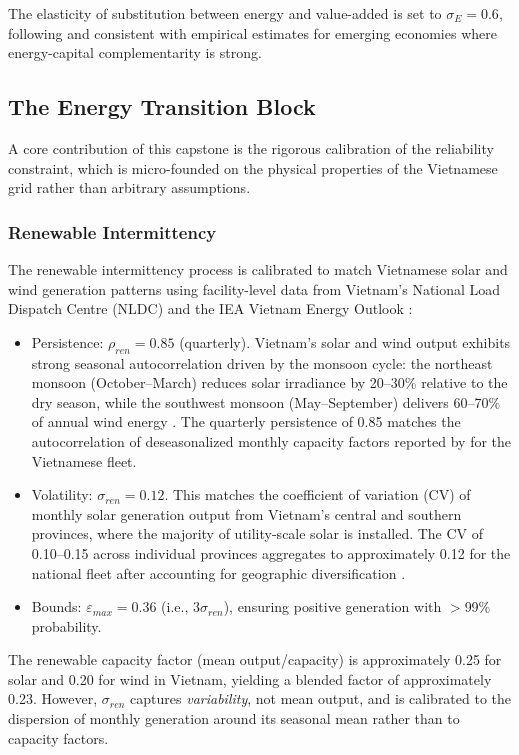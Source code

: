 \documentclass[12pt, a4paper]{article}
\begin{document}
The elasticity of substitution between energy and value-added is set to $\sigma_E = 0.6$, following \citet{heutel2012} and consistent with empirical estimates for emerging economies where energy-capital complementarity is strong.

\subsection{The Energy Transition Block}

A core contribution of this capstone is the rigorous calibration of the reliability constraint, which is micro-founded on the physical properties of the Vietnamese grid rather than arbitrary assumptions.

\subsubsection{Renewable Intermittency}

The renewable intermittency process is calibrated to match Vietnamese solar and wind generation patterns using facility-level data from Vietnam's National Load Dispatch Centre (NLDC) and the IEA Vietnam Energy Outlook \citep{iea2023}:

\begin{itemize}
    \item Persistence: $\rho_{ren} = 0.85$ (quarterly). Vietnam's solar and wind output exhibits strong seasonal autocorrelation driven by the monsoon cycle: the northeast monsoon (October--March) reduces solar irradiance by 20--30\% relative to the dry season, while the southwest monsoon (May--September) delivers 60--70\% of annual wind energy \citep{nguyenle2019}. The quarterly persistence of 0.85 matches the autocorrelation of deseasonalized monthly capacity factors reported by \citet{iea2023} for the Vietnamese fleet.
    \item Volatility: $\sigma_{ren} = 0.12$. This matches the coefficient of variation (CV) of monthly solar generation output from Vietnam's central and southern provinces, where the majority of utility-scale solar is installed. The CV of 0.10--0.15 across individual provinces aggregates to approximately 0.12 for the national fleet after accounting for geographic diversification \citep{gso2024}.
    \item Bounds: $\varepsilon_{max} = 0.36$ (i.e., $3\sigma_{ren}$), ensuring positive generation with $>$99\% probability.
\end{itemize}

The renewable capacity factor (mean output/capacity) is approximately 0.25 for solar and 0.20 for wind in Vietnam, yielding a blended factor of approximately 0.23. However, $\sigma_{ren}$ captures \textit{variability}, not mean output, and is calibrated to the dispersion of monthly generation around its seasonal mean rather than to capacity factors.
\end{document}
